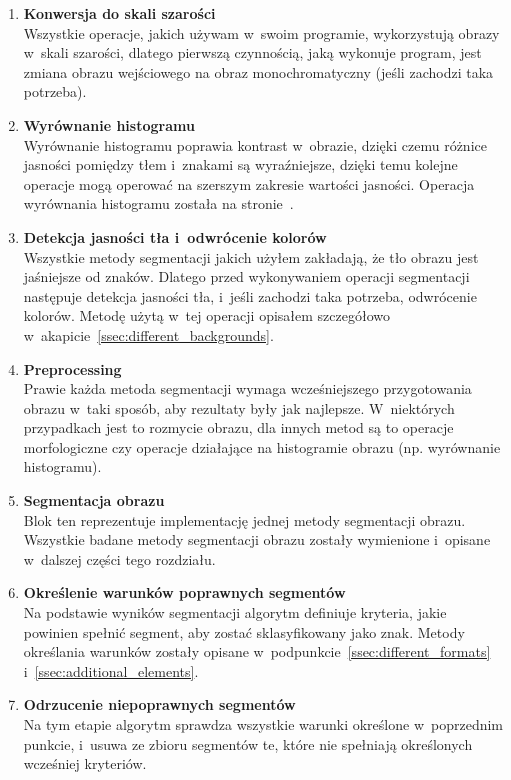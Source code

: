 \begin{enumerate}
  \item \textbf{Konwersja do skali szarości}\\
    Wszystkie operacje, jakich używam w~swoim programie, wykorzystują obrazy w~skali szarości, dlatego pierwszą czynnością, jaką wykonuje program, jest zmiana obrazu wejściowego na obraz monochromatyczny (jeśli zachodzi taka potrzeba).
  \item \textbf{Wyrównanie histogramu}\\
    Wyrównanie histogramu poprawia kontrast w~obrazie, dzięki czemu różnice jasności pomiędzy tłem i~znakami są wyraźniejsze, dzięki temu kolejne operacje mogą operować na szerszym zakresie wartości jasności. Operacja wyrównania histogramu została na stronie~\pageref{sssec:histogram_eq}.
  \item \textbf{Detekcja jasności tła i~odwrócenie kolorów} \\
    Wszystkie metody segmentacji jakich użyłem zakładają, że tło obrazu jest jaśniejsze od znaków. Dlatego przed wykonywaniem operacji segmentacji następuje detekcja jasności tła, i~jeśli zachodzi taka potrzeba, odwrócenie kolorów. Metodę użytą w~tej operacji opisałem szczegółowo w~akapicie~\ref{ssec:different_backgrounds}.
  \item \textbf{Preprocessing}\\
    Prawie każda metoda segmentacji wymaga wcześniejszego przygotowania obrazu w~taki sposób, aby rezultaty były jak najlepsze. W~niektórych przypadkach jest to rozmycie obrazu, dla innych metod są to operacje morfologiczne czy operacje działające na histogramie obrazu (np. wyrównanie histogramu).
  \item \textbf{Segmentacja obrazu}\\
    Blok ten reprezentuje implementację jednej metody segmentacji obrazu. Wszystkie badane metody segmentacji obrazu zostały wymienione i~opisane w~dalszej części tego rozdziału.
    \item \textbf{Określenie warunków poprawnych segmentów}\\
      Na podstawie wyników segmentacji algorytm definiuje kryteria, jakie powinien spełnić segment, aby zostać sklasyfikowany jako znak. Metody określania warunków zostały opisane w~podpunkcie~\ref{ssec:different_formats} i~\ref{ssec:additional_elements}.
    \item \textbf{Odrzucenie niepoprawnych segmentów}\\
      Na tym etapie algorytm sprawdza wszystkie warunki określone w~poprzednim punkcie, i~usuwa ze zbioru segmentów te, które nie spełniają określonych wcześniej kryteriów.

\end{enumerate}
